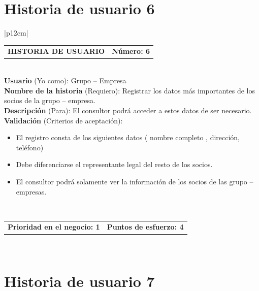 \documentclass[11pt,letterpaper]{report}
\begin{document}
	\section{Historia de usuario 6}
	\begin{center}	
		\begin{tabular}{|p{12cm}|}
			\hline
			\begin{tabular}{c|c}
				\textbf{HISTORIA DE USUARIO} & \textbf{Número: 6} \\
			\end{tabular} \\ \hline
			\textbf{Usuario} (Yo como): Grupo – Empresa \\ \hline
			\textbf{Nombre de la historia} (Requiero): Registrar los datos más importantes de los socios de la grupo – empresa. \\ \hline
			\textbf{Descripción} (Para): El consultor podrá acceder a estos datos de ser necesario. \\ \hline
			\textbf{Validación} (Criterios de aceptación): \\
			\begin{minipage}{12cm}
				\begin{itemize}
					\item El registro consta de los siguientes datos ( nombre completo , dirección, teléfono)
					\item Debe diferenciarse el representante legal del resto de los socios.
					\item El consultor podrá solamente ver la información de los socios de las grupo – empresas.
				\end{itemize}
			\end{minipage} \\ \hline
			\begin{tabular}{c|c}
				\textbf{Prioridad en el negocio: 1} & \textbf{Puntos de esfuerzo: 4} \\
			\end{tabular} \\ \hline
		\end{tabular}
	\end{center}
	
	\section{Historia de usuario 7}
	
\end{document}
